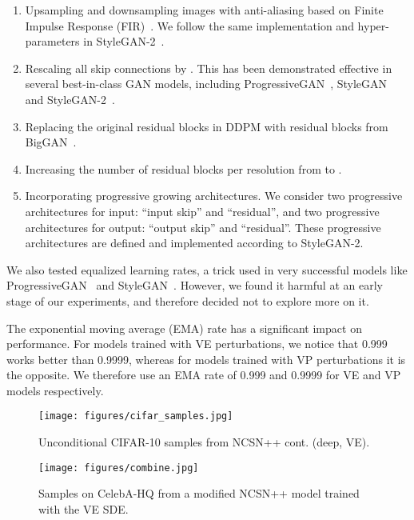\documentclass{article} \usepackage{iclr2021_conference,times}
\begin{document}
\begin{enumerate}
    \item Upsampling and downsampling images with anti-aliasing based on Finite Impulse Response (FIR)~\citep{zhang2019shiftinvar}. We follow the same implementation and hyper-parameters in StyleGAN-2~\citep{Karras2019stylegan2}.
    \item Rescaling all skip connections by . This has been demonstrated effective in several best-in-class GAN models, including ProgressiveGAN~\citep{karras2018progressive}, StyleGAN~\citep{karras2019style} and StyleGAN-2~\citep{Karras2019stylegan2}.
    \item Replacing the original residual blocks in DDPM with residual blocks from BigGAN~\citep{brock2018large}.
    \item Increasing the number of residual blocks per resolution from  to .
    \item Incorporating progressive growing architectures. We consider two progressive architectures for input: ``input skip'' and ``residual'', and two progressive architectures for output: ``output skip'' and ``residual''. These progressive architectures are defined and implemented according to StyleGAN-2.
\end{enumerate}

We also tested equalized learning rates, a trick used in very successful models like ProgressiveGAN~\citep{karras2018progressive} and StyleGAN~\citep{karras2019style}. However, we found it harmful at an early stage of our experiments, and therefore decided not to explore more on it.

The exponential moving average (EMA) rate has a significant impact on performance. For models trained with VE perturbations, we notice that 0.999 works better than 0.9999, whereas for models trained with VP perturbations it is the opposite. We therefore use an EMA rate of 0.999 and 0.9999 for VE and VP models respectively.


\begin{figure}
    \centering
    \texttt{[image: figures/cifar\_samples.jpg]}
    \caption{Unconditional CIFAR-10 samples from NCSN++ cont. (deep, VE).}
    \label{fig:cifar_samples}
\end{figure}

\begin{figure}
    \centering
    \texttt{[image: figures/combine.jpg]}
    \caption{Samples on  CelebA-HQ from a modified NCSN++ model trained with the VE SDE.}
    \label{fig:celebahq}
\end{figure}
\end{document}

